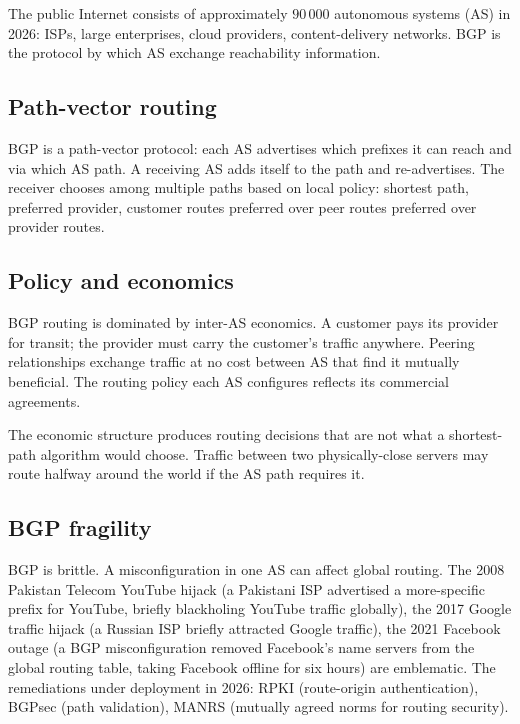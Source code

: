 The public Internet consists of approximately $90\,000$ autonomous systems (AS) in 2026: ISPs, large enterprises, cloud providers, content-delivery networks. BGP is the protocol by which AS exchange reachability information.

\subsection{Path-vector routing}

BGP is a path-vector protocol: each AS advertises which prefixes it can reach and via which AS path. A receiving AS adds itself to the path and re-advertises. The receiver chooses among multiple paths based on local policy: shortest path, preferred provider, customer routes preferred over peer routes preferred over provider routes.

\subsection{Policy and economics}

BGP routing is dominated by inter-AS economics. A customer pays its provider for transit; the provider must carry the customer's traffic anywhere. Peering relationships exchange traffic at no cost between AS that find it mutually beneficial. The routing policy each AS configures reflects its commercial agreements.

The economic structure produces routing decisions that are not what a shortest-path algorithm would choose. Traffic between two physically-close servers may route halfway around the world if the AS path requires it.

\subsection{BGP fragility}

BGP is brittle. A misconfiguration in one AS can affect global routing. The 2008 Pakistan Telecom YouTube hijack (a Pakistani ISP advertised a more-specific prefix for YouTube, briefly blackholing YouTube traffic globally), the 2017 Google traffic hijack (a Russian ISP briefly attracted Google traffic), the 2021 Facebook outage (a BGP misconfiguration removed Facebook's name servers from the global routing table, taking Facebook offline for six hours) are emblematic. The remediations under deployment in 2026: RPKI (route-origin authentication), BGPsec (path validation), MANRS (mutually agreed norms for routing security).

